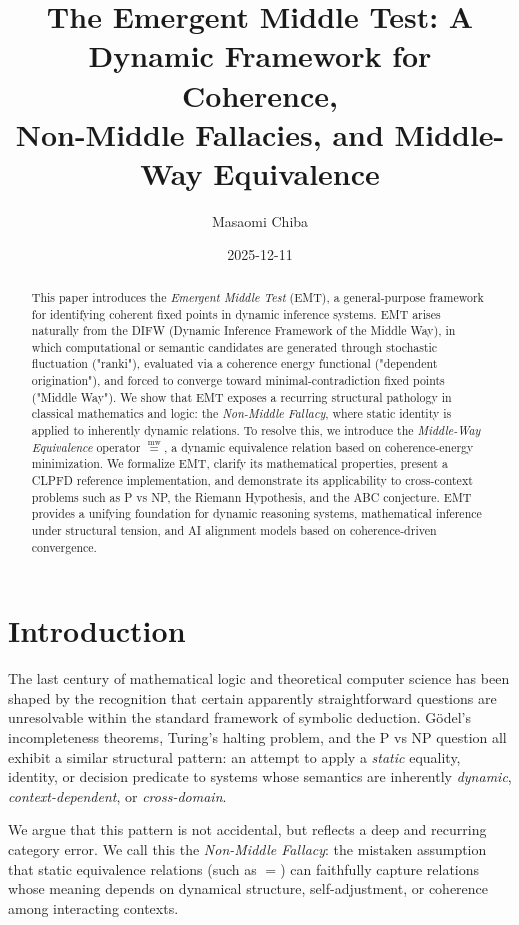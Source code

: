 \documentclass[11pt]{article}
\title{%
The Emergent Middle Test: A Dynamic Framework for Coherence,\\
Non-Middle Fallacies, and Middle-Way Equivalence
}
\author{Masaomi Chiba}
\date{2025-12-11}
\newcommand{\mweq}{\mathrel{\overset{\mathrm{mw}}{=}}}
\theoremstyle{definition}
\theoremstyle{remark}
\begin{document}
\maketitle

\begin{abstract}
This paper introduces the \emph{Emergent Middle Test} (EMT), a
general-purpose framework for identifying coherent fixed points
in dynamic inference systems. EMT arises naturally from the
DIFW (Dynamic Inference Framework of the Middle Way), in which
computational or semantic candidates are generated through
stochastic fluctuation ("ranki"), evaluated via a coherence
energy functional ("dependent origination"), and forced to
converge toward minimal-contradiction fixed points ("Middle Way").
We show that EMT exposes a recurring structural pathology in
classical mathematics and logic: the \emph{Non-Middle Fallacy},
where static identity is applied to inherently dynamic relations.
To resolve this, we introduce the \emph{Middle-Way Equivalence}
operator $\mweq$, a dynamic equivalence relation based on
coherence-energy minimization. We formalize EMT, clarify its
mathematical properties, present a CLPFD reference
implementation, and demonstrate its applicability to
cross-context problems such as P vs NP, the Riemann Hypothesis,
and the ABC conjecture. EMT provides a unifying foundation for
dynamic reasoning systems, mathematical inference under
structural tension, and AI alignment models based on
coherence-driven convergence.
\end{abstract}

\section{Introduction}

The last century of mathematical logic and theoretical computer
science has been shaped by the recognition that certain
apparently straightforward questions are unresolvable within the
standard framework of symbolic deduction. G\"odel's
incompleteness theorems, Turing's halting problem, and the P vs NP
question all exhibit a similar structural pattern: an attempt to
apply a \emph{static} equality, identity, or decision predicate to
systems whose semantics are inherently \emph{dynamic},
\emph{context-dependent}, or \emph{cross-domain}.

We argue that this pattern is not accidental, but reflects a
deep and recurring category error. We call this the
\emph{Non-Middle Fallacy}: the mistaken assumption that
static equivalence relations (such as $=$) can faithfully capture
relations whose meaning depends on dynamical structure,
self-adjustment, or coherence among interacting contexts.
\end{document}
